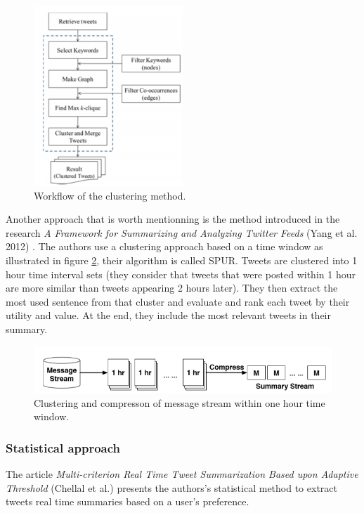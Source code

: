 \documentclass[runningheads]{llncs}
\begin{document}
\begin{figure}[H]
    \centering
    \includegraphics[width=0.5\textwidth]{fig4.png}
    \caption{Workflow of the clustering method.}
    \label{fig:fig4}
\end{figure}

Another approach that is worth mentionning is the method introduced in the
research \textit{A Framework for Summarizing and Analyzing Twitter Feeds} (Yang
et al. 2012) \cite{yang_framework_2012}.
The authors use a clustering approach based on a time window as illustrated in
figure \ref{fig:fig5}, their algorithm is called SPUR. Tweets are clustered into 1
hour time interval sets (they consider that tweets that were posted within 1
hour are more similar than tweets appearing 2 hours later).  They then extract
the most used sentence from that cluster and evaluate and rank each tweet by
their utility and value. At the end, they include the most relevant tweets in
their summary.

\begin{figure}[H]
    \includegraphics[width=\textwidth]{fig5.png}
    \caption{Clustering and compresson of message stream within one hour time window.}
    \label{fig:fig5}
\end{figure}

\subsubsection{Statistical approach}

The article \textit{Multi-criterion Real Time Tweet Summarization Based upon
Adaptive Threshold} (Chellal et al.) \cite{chellal_multi-criterion_2016}
presents the authors's statistical method to extract tweets real time summaries
based on a user's preference.
\end{document}
